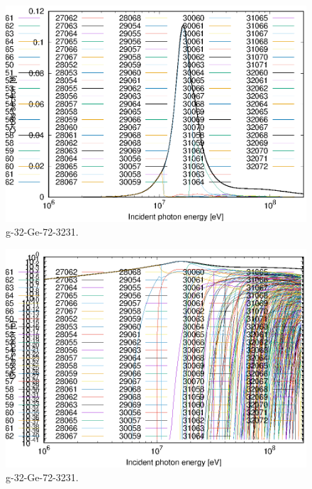 \begin{figure}
 \includegraphics[width=\linewidth]{eps/g_32-Ge-72_3231.eps}
  \caption{g-32-Ge-72-3231.}
\end{figure}
\begin{figure}
 \includegraphics[width=\linewidth]{eps-log/g_32-Ge-72_3231.eps}
 \caption{g-32-Ge-72-3231.}
\end{figure}
\newpage \clearpage

